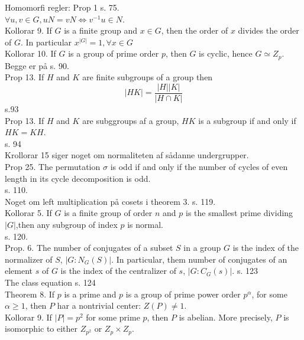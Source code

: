 \documentclass[11pt]{article}
\begin{document}
Homomorfi regler: Prop 1 s. 75.\\

$\forall{u, v \in G}, uN = vN \iff v^{-1}u \in N$.\\

Kollorar 9. If $G$ is a finite group and $x \in G$, then the order of $x$ divides the order of $G$. In particular $x^{|G|} = 1, \forall{x \in G}$\\
Kollorar 10. If $G$ is a group of prime order $p$, then $G$ is cyclic, hence $G \simeq Z_p$.\\
Begge er på s. 90.\\

Prop 13. If $H$ and $K$ are finite subgroups of a group then
$$|HK| = \frac{|H||K|}{|H \cap K|}$$
s.93\\

Prop 13. If $H$ and $K$ are subggroups af a group, $HK$ is a subgroup if and only if $HK = KH$.\\
s. 94\\
Krollorar 15 siger noget om normaliteten af sådanne undergrupper.\\

Prop 25. The permutation $\sigma$ is odd if and only if the number of cycles of even length in its cycle decomposition is odd.\\
s. 110.\\

Noget om left multiplication på cosets i theorem 3. s. 119.\\

Kollorar 5. If $G$ is a finite group of order $n$ and $p$ is the smallest prime dividing $|G|$,then any subgroup of index $p$ is normal.\\
s. 120.\\

Prop. 6. The number of conjugates of a subset $S$ in a group $G$ is the index of the normalizer of $S$, $|G : N_G(S)|$. In particular, them number of conjugates of an element $s$ of $G$ is the index of the centralizer of $s$, $|G : C_G(s)|$.
s. 123\\

The class equation s. 124\\

Theorem 8. If $p$ is a prime and $p$ is a group of prime power order $p^\alpha$, for some $\alpha \geq 1$, then $P$ har a nontrivial center: $Z(P) \neq 1$.\\

Kollorar 9. If $|P| = p^2$ for some prime $p$, then $P$ is abelian. More precisely, $P$ is isomorphic to either $Z_{p^2}$ or $Z_p \times Z_p$.\\
\end{document}
